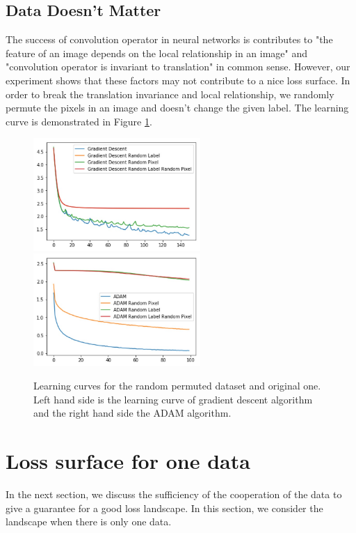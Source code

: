 \documentclass{article}
\theoremstyle{plain}
\theoremstyle{definition}
\begin{document}
\subsection{Data Doesn't Matter}

The success of convolution operator in neural networks is contributes to "the feature of an image depends on the local relationship in an image" and "convolution operator is invariant to translation" in common sense. However, our experiment shows that these factors may not contribute to a nice loss surface. In order to break the translation invariance and local relationship, we randomly permute the pixels in an image and doesn't change the given label. The learning curve is demonstrated in Figure \ref{randomperb}.

\begin{figure}[htp]
	\centering
	\includegraphics[width=2.5in]{gdrp.jpg}
	\includegraphics[width=2.5in]{adamrp.jpg}
	\caption{Learning curves for the random permuted dataset and original one. Left hand side is the learning curve of gradient descent algorithm and the right hand side the ADAM algorithm.}
	\label{randomperb}
\end{figure}


\section{Loss surface for one data}

In the next section, we discuss the sufficiency of the cooperation of the data to give a guarantee for a good loss landscape. In this section, we consider the landscape when there is only one data.
\end{document}
